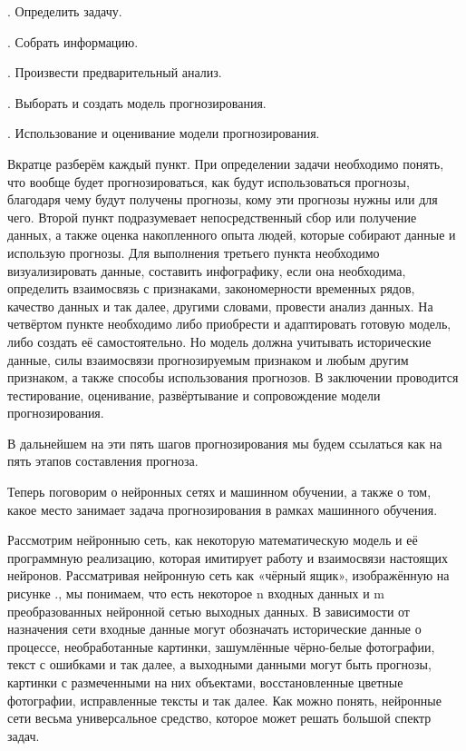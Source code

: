 {  \par {}. Определить задачу.
  \par {}. Собрать информацию.
  \par {}. Произвести предварительный анализ.
  \par {}. Выборать и создать модель прогнозирования.
  \par {}. Использование и оценивание модели прогнозирования.

  \par \redline Вкратце разберём каждый пункт. При определении задачи необходимо понять, что вообще будет прогнозироваться, как будут использоваться прогнозы, благодаря чему будут получены прогнозы, кому эти прогнозы нужны или для чего. Второй пункт подразумевает непосредственный сбор или получение данных, а также оценка накопленного опыта людей, которые собирают данные и использую прогнозы. Для выполнения третьего пункта необходимо визуализировать данные, составить инфографику, если она необходима, определить взаимосвязь с признаками, закономерности временных рядов, качество данных и так далее, другими словами, провести анализ данных. На четвёртом пункте необходимо либо приобрести и адаптировать готовую модель, либо создать её самостоятельно. Но модель должна учитывать исторические данные, силы взаимосвязи прогнозируемым признаком и любым другим признаком, а также способы использования прогнозов. В заключении проводится тестирование, оценивание, развёртывание и сопровождение модели прогнозирования.

  \par \redline В дальнейшем на эти пять шагов прогнозирования мы будем ссылаться как на пять этапов составления прогноза.

  \par \redline Теперь поговорим о нейронных сетях и машинном обучении, а также о том, какое место занимает задача прогнозирования в рамках машинного обучения.

  \par \redline Рассмотрим нейронныю сеть, как некоторую математическую модель и её программную реализацию, которая имитирует работу и взаимосвязи настоящих нейронов.  Рассматривая нейронную сеть как «чёрный ящик», изображённую на рисунке \thechaptercntr .\theimagecntr, мы понимаем, что есть некоторое n входных данных и m преобразованных нейронной сетью выходных данных. В зависимости от назначения сети входные данные могут обозначать исторические данные о процессе, необработанные картинки, зашумлённые чёрно-белые фотографии, текст с ошибками и так далее, а выходными данными могут быть прогнозы, картинки с размеченными на них объектами, восстановленные цветные фотографии, исправленные тексты и так далее. Как можно понять, нейронные сети весьма универсальное средство, которое может решать большой спектр задач.

}
